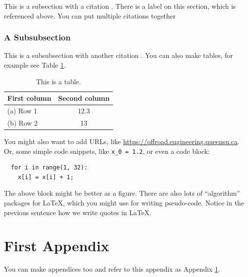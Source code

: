 \documentclass[12pt,letterpaper,fleqn,oneside]{qu-handout}
\newcommand*{\mintpy}[1]{\texttt{#1}}
\begin{document}
This is a subsection with a citation \cite{Ogata:2001aa}.  There is a label on this section, which is referenced above.  You can put multiple citations together \cite{Marshall:2004aa,Ogata:2001aa}

\subsubsection{A Subsubsection}

This is a subsubsection with another citation \cite[p.\ 1964]{Marshall:2004aa}.  You can also make tables, for example see Table \ref{tbl:example}.

\begin{table}
  \caption{This is a table.}
  \begin{center}
    \begin{tabular}{lc}
      \toprule
      \bf First column & \bf Second column \\ \midrule
      (a) Row 1 & 12.3 \\
      (b) Row 2 & 13 \\
      \bottomrule
    \end{tabular}
  \end{center}
  \label{tbl:example}
\end{table}%

You might also want to add URLs, like \url{https://offroad.engineering.queensu.ca}.  Or, some simple code snippets, like  \mintpy{x_0 = 1.2}, or even a code block:
\begin{verbatim}
  for i in range(1, 32):
    x[i] = x[i] + 1;
\end{verbatim}
The above block might be better as a figure.  There are also lots of ``algorithm'' packages for LaTeX, which you might use for writing pseudo-code.  Notice in the previous sentence how we write quotes in \LaTeX.






\appendix

\section{First Appendix}
\label{sec:appendix}

You can make appendices too and refer to this appendix as Appendix \ref{sec:appendix}.

\end{document}
